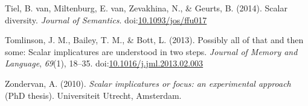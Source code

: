 \documentclass[man]{apa6}
\theoremstyle{definition}
\theoremstyle{definition}
\theoremstyle{definition}
\theoremstyle{remark}
\begin{document}
\hypertarget{ref-VanTiel2014}{}
Tiel, B. van, Miltenburg, E. van, Zevakhina, N., \& Geurts, B. (2014).
Scalar diversity. \emph{Journal of Semantics}.
doi:\href{https://doi.org/10.1093/jos/ffu017}{10.1093/jos/ffu017}

\hypertarget{ref-Tomlinson2013}{}
Tomlinson, J. M., Bailey, T. M., \& Bott, L. (2013). Possibly all of
that and then some: Scalar implicatures are understood in two steps.
\emph{Journal of Memory and Language}, \emph{69}(1), 18--35.
doi:\href{https://doi.org/10.1016/j.jml.2013.02.003}{10.1016/j.jml.2013.02.003}

\hypertarget{ref-Zondervan2010}{}
Zondervan, A. (2010). \emph{Scalar implicatures or focus: an
experimental approach} (PhD thesis). Universiteit Utrecht, Amsterdam.
\end{document}
